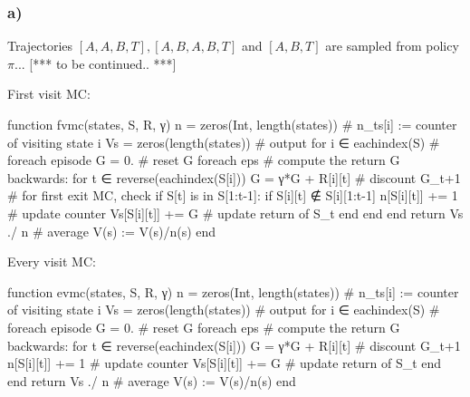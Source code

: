 \documentclass[12pt]{article}
\def\att{                    %
        \marginpar[ \hspace*{\fill} \raisebox{-0.2em}{\rule{2mm}{1.2em}} ]
        {\raisebox{-0.2em}{\rule{2mm}{1.2em}} }
        }
\def\at#1{[*** \att #1 ***]}  %
\begin{document}
\subsubsection*{a)}
Trajectories $[A,A,B,T], [A,B,A,B,T]$ and $[A,B,T]$ are sampled from policy $\pi$... \at{to be continued..}

First visit MC:
\begin{jllisting}
    function fvmc(states, S, R, γ)
        n = zeros(Int, length(states)) # n_ts[i] := counter of visiting state i
        Vs = zeros(length(states)) # output
        for i ∈ eachindex(S) # foreach episode
            G = 0. # reset G foreach eps
            # compute the return G backwards:
            for t ∈ reverse(eachindex(S[i]))
                G = γ*G + R[i][t] # discount G_{t+1}
                # for first exit MC, check if S[t] is in S[1:t-1]:
                if S[i][t] ∉ S[i][1:t-1]
                    n[S[i][t]] += 1 # update counter
                    Vs[S[i][t]] += G # update return of S_t
                end
            end
        end
        return Vs ./ n # average V(s) := V(s)/n(s)
    end
\end{jllisting}

Every visit MC:
\begin{jllisting}
    function evmc(states, S, R, γ)
        n = zeros(Int, length(states)) # n_ts[i] := counter of visiting state i
        Vs = zeros(length(states)) # output
        for i ∈ eachindex(S) # foreach episode
            G = 0. # reset G foreach eps
            # compute the return G backwards:
            for t ∈ reverse(eachindex(S[i]))
                G = γ*G + R[i][t] # discount G_{t+1}
                n[S[i][t]] += 1 # update counter
                Vs[S[i][t]] += G # update return of S_t
            end
        end
        return Vs ./ n # average V(s) := V(s)/n(s)
    end
\end{jllisting}
\end{document}
